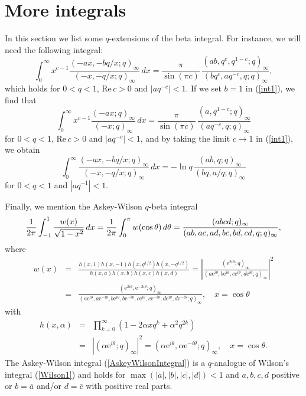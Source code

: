 \documentclass[envcountchap,graybox]{svmono}
\newcommand{\e}{\textrm{e}}
\begin{document}
\section{More integrals}
\par\setcounter{equation}{0}
\label{integrals2}

In this section we list some $q$-extensions of the beta integral.
For instance, we will need the following integral:
\begin{equation}
\label{int1}
\int_0^{\infty}x^{c-1}\frac{(-ax,-bq/x;q)_{\infty}}{(-x,-q/x;q)_{\infty}}\,dx
=\frac{\pi}{\sin(\pi c)}\,\frac{(ab,q^c,q^{1-c};q)_{\infty}}{(bq^c,aq^{-c},q;q)_{\infty}},
\end{equation}
which holds for $0<q<1$, $\textrm{Re}\,c>0$ and $\left|aq^{-c}\right|<1$.
If we set $b=1$ in (\ref{int1}), we find that
\begin{equation}
\label{int2}
\int_0^{\infty}x^{c-1}\frac{(-ax;q)_{\infty}}{(-x;q)_{\infty}}\,dx
=\frac{\pi}{\sin(\pi c)}\,\frac{(a,q^{1-c};q)_{\infty}}{(aq^{-c},q;q)_{\infty}}
\end{equation}
for $0<q<1$, $\textrm{Re}\,c>0$ and $\left|aq^{-c}\right|<1$,
and by taking the limit $c\rightarrow 1$ in (\ref{int1}), we obtain
\begin{equation}
\label{int3}
\int_0^{\infty}\frac{(-ax,-bq/x;q)_{\infty}}{(-x,-q/x;q)_{\infty}}\,dx
=-\ln q\,\frac{(ab,q;q)_{\infty}}{(bq,a/q;q)_{\infty}}
\end{equation}
for $0<q<1$ and $\left|aq^{-1}\right|<1$.

Finally, we mention the Askey-Wilson $q$-beta integral
\begin{equation}
\label{AskeyWilsonIntegral}\index{Askey-Wilson integral}
\index{Askey-Wilson q-beta integral@Askey-Wilson $q$-beta integral}
\index{q-Beta integral@$q$-Beta integral}
\frac{1}{2\pi}\int_{-1}^1\frac{w(x)}{\sqrt{1-x^2}}\,dx=\frac{1}{2\pi}\int_0^{\pi}w(\cos\theta)\,d\theta
=\frac{(abcd;q)_{\infty}}{(ab,ac,ad,bc,bd,cd,q;q)_{\infty}},
\end{equation}
where
\begin{eqnarray*}
w(x)&=&\frac{h(x,1)h(x,-1)h(x,q^{1/2})h(x,-q^{1/2})}{h(x,a)h(x,b)h(x,c)h(x,d)}
=\left|\frac{(\e^{2i\theta};q)_{\infty}}{(a\e^{i\theta},b\e^{i\theta},c\e^{i\theta},d\e^{i\theta};q)_{\infty}}\right|^2\\
&=&\frac{(\e^{2i\theta},\e^{-2i\theta};q)_{\infty}}
{(a\e^{i\theta},a\e^{-i\theta},b\e^{i\theta},b\e^{-i\theta},c\e^{i\theta},c\e^{-i\theta},d\e^{i\theta},d\e^{-i\theta};q)_{\infty}},
\quad x=\cos\theta
\end{eqnarray*}
with
\begin{eqnarray*}
h(x,\alpha)&=&\prod_{k=0}^{\infty}\left(1-2\alpha xq^k+\alpha^2q^{2k}\right)\\
&=&\left|(\alpha \e^{i\theta};q)_{\infty}\right|^2
=\left(\alpha \e^{i\theta},\alpha \e^{-i\theta};q\right)_{\infty},\quad x=\cos\theta.
\end{eqnarray*}
The Askey-Wilson integral (\ref{AskeyWilsonIntegral}) is a $q$-analogue of Wilson's integral
(\ref{Wilson1}) and holds for $\max(|a|,|b|,|c|,|d|)<1$ and $a,b,c,d$ positive or
$b=\overline{a}$ and/or $d=\overline{c}$ with positive real parts.
\end{document}
